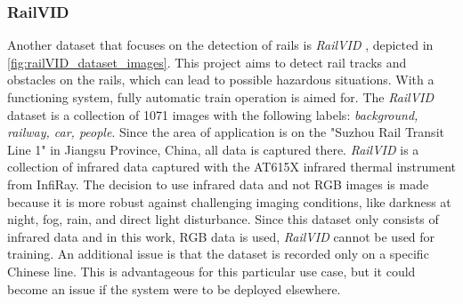 \subsubsection{RailVID}
\label{subsubsec:railVID}
Another dataset that focuses on the detection of rails is \textit{RailVID} \cite{yuan2022railvid}, depicted in \autoref{fig:railVID_dataset_images}. This project aims to detect rail tracks and obstacles on the rails, which can lead to possible hazardous situations. With a functioning system, fully automatic train operation is aimed for. The \textit{RailVID} dataset is a collection of 1071 images with the following labels: \textit{background, railway, car, people}. Since the area of application is on the "Suzhou Rail Transit Line 1" in Jiangsu Province, China, all data is captured there. \textit{RailVID} is a collection of infrared data captured with the AT615X infrared thermal instrument from InfiRay. The decision to use infrared data and not RGB images is made because it is more robust against challenging imaging conditions, like darkness at night, fog, rain, and direct light disturbance.
Since this dataset only consists of infrared data and in this work, \ac{RGB} data is used, \textit{RailVID} cannot be used for training. An additional issue is that the dataset is recorded only on a specific Chinese line. This is advantageous for this particular use case, but it could become an issue if the system were to be deployed elsewhere.


